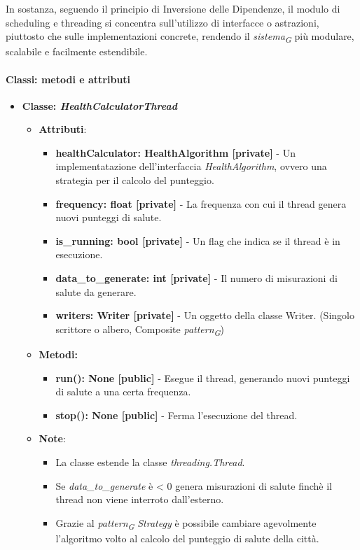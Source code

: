 In sostanza, seguendo il principio di Inversione delle Dipendenze, il modulo di scheduling e threading si concentra sull'utilizzo di interfacce o astrazioni, piuttosto che sulle implementazioni concrete, rendendo il \textit{sistema}\textsubscript{\textit{G}} più modulare, scalabile e facilmente estendibile.

\paragraph*{Classi: metodi e attributi}
\begin{itemize}
    \item{\textbf{Classe: \textit{HealthCalculatorThread}}}
    \begin{itemize}
    \item\textbf{Attributi}:
        \begin{itemize}
        \item \textbf{healthCalculator: HealthAlgorithm [private]} - Un implementatazione dell'interfaccia \textit{HealthAlgorithm}, ovvero una strategia per il calcolo del punteggio.
        \item \textbf{frequency: float [private]} - La frequenza con cui il thread genera nuovi punteggi di salute.
        \item \textbf{is\_running: bool [private]} - Un flag che indica se il thread è in esecuzione.
        \item \textbf{data\_to\_generate: int [private]} - Il numero di misurazioni di salute da generare.
        \item \textbf{writers: Writer [private]} - Un oggetto della classe Writer. (Singolo scrittore o albero, Composite \textit{pattern}\textsubscript{\textit{G}})
    \end{itemize}
    \item \textbf{Metodi: }
    \begin{itemize}
        \item \textbf{run(): None [public]} - Esegue il thread, generando nuovi punteggi di salute a una certa frequenza.
        \item \textbf{stop(): None [public]} - Ferma l'esecuzione del thread.
    \end{itemize}
    \item\textbf{Note}:
        \begin{itemize}
            \item La classe estende la classe \textit{threading.Thread}.
            \item Se \textit{data\_to\_generate} è < 0 genera misurazioni di salute finchè il thread non viene interroto dall'esterno.
            \item   Grazie al \textit{pattern}\textsubscript{\textit{G}} \textit{Strategy} è possibile cambiare agevolmente l'algoritmo volto al calcolo del punteggio di salute della città.
        \end{itemize}
    \end{itemize}
\end{itemize}


